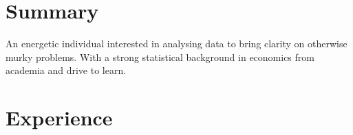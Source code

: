 \documentclass[letterpaper]{twentysecondcv} %
\begin{document}
\makeprofile %


\section{Summary}

{\begin{description}
		\item{An energetic individual interested in analysing data to bring clarity on otherwise murky problems. With a strong statistical background in economics from academia and drive to learn.} 
\end{description}}

\vspace{8mm}



\section{Experience}
\end{document}
